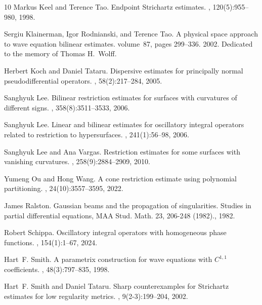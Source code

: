 \documentclass{amsart}
\theoremstyle{definition}
\begin{document}
\begin{thebibliography}{10}
Markus Keel and Terence Tao.
\newblock Endpoint {S}trichartz estimates.
, 120(5):955--980, 1998.

Sergiu Klainerman, Igor Rodnianski, and Terence Tao.
\newblock A physical space approach to wave equation bilinear estimates.
\newblock volume~87, pages 299--336. 2002.
\newblock Dedicated to the memory of Thomas H.\ Wolff.

Herbert Koch and Daniel Tataru.
\newblock Dispersive estimates for principally normal pseudodifferential
  operators.
, 58(2):217--284, 2005.

Sanghyuk Lee.
\newblock Bilinear restriction estimates for surfaces with curvatures of
  different signs.
, 358(8):3511--3533, 2006.

Sanghyuk Lee.
\newblock Linear and bilinear estimates for oscillatory integral operators
  related to restriction to hypersurfaces.
, 241(1):56--98, 2006.

Sanghyuk Lee and Ana Vargas.
\newblock Restriction estimates for some surfaces with vanishing curvatures.
, 258(9):2884--2909, 2010.

Yumeng Ou and Hong Wang.
\newblock A cone restriction estimate using polynomial partitioning.
, 24(10):3557--3595, 2022.

James Ralston.
\newblock Gaussian beams and the propagation of singularities.
\newblock Studies in partial differential equations, {MAA} {Stud}. {Math}. 23,
  206-248 (1982)., 1982.

Robert Schippa.
\newblock Oscillatory integral operators with homogeneous phase functions.
, 154(1):1--67, 2024.

Hart~F. Smith.
\newblock A parametrix construction for wave equations with {$C^{1,1}$}
  coefficients.
, 48(3):797--835, 1998.

Hart~F. Smith and Daniel Tataru.
\newblock Sharp counterexamples for {S}trichartz estimates for low regularity
  metrics.
, 9(2-3):199--204, 2002.


\end{thebibliography}
\end{document}
